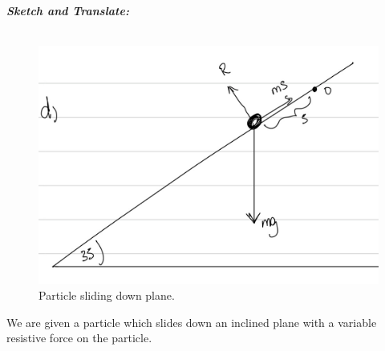 \begin{subquestions}
\textbf{\textit{Sketch and Translate:}} \\ \\
\begin{figure}[H]
	\begin{center}
		\includegraphics[scale=0.25]{../2014/figures/2014q6-4}
		\caption{\label{2014:q6:Sketch4} Particle sliding down plane.}
	\end{center}
\end{figure}
We are given a particle which slides down an inclined plane with a variable resistive force on the particle.





\end{subquestions}
